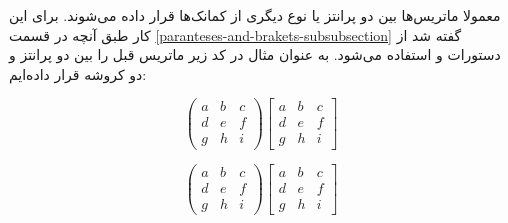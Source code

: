 
معمولا ماتریس‌ها بین دو پرانتز یا نوع دیگری از کمانک‌ها قرار داده می‌شوند. برای
این کار طبق آنچه در قسمت \ref{paranteses-and-brakets-subsubsection} گفته شد از
دستورات  و  استفاده می‌شود. به
عنوان مثال در کد زیر ماتریس قبل را بین دو پرانتز و دو کروشه قرار داده‌ایم:

\begin{latex}
\[
 \left(
 \begin{matrix}
  a & b & c \\
  d & e & f \\
  g & h & i
 \end{matrix}
 \right)
 \left[
 \begin{matrix}
  a & b & c \\
  d & e & f \\
  g & h & i
 \end{matrix}
 \right]
\]
\end{latex}
\[
 \left(
 \begin{matrix}
  a & b & c \\
  d & e & f \\
  g & h & i
 \end{matrix}
 \right)
 \left[
 \begin{matrix}
  a & b & c \\
  d & e & f \\
  g & h & i
 \end{matrix}
 \right]
\]

